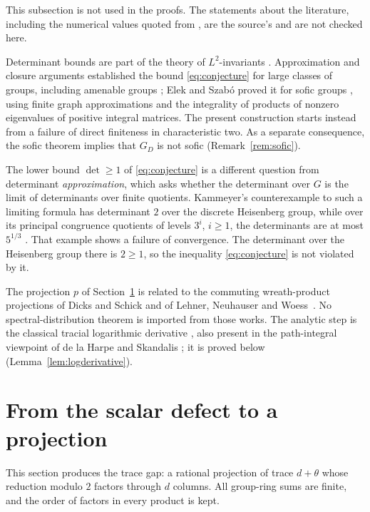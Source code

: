 \documentclass[11pt]{article}
\theoremstyle{remark}
\numberwithin{equation}{section}
\begin{document}
This subsection is not used in the proofs. The statements about the literature, including the numerical values quoted from \cite{Kammeyer2026}, are the source's and are not checked here.

Determinant bounds are part of the theory of $L^2$-invariants \cite{Luck2002}. Approximation and closure arguments established the bound \eqref{eq:conjecture} for large classes of groups, including amenable groups \cite[Theorem 1.21, with its erratum]{Schick2001}; Elek and Szab\'o proved it for sofic groups \cite[Theorem 5]{ElekSzabo2005}, using finite graph approximations and the integrality of products of nonzero eigenvalues of positive integral matrices. The present construction starts instead from a failure of direct finiteness in characteristic two. As a separate consequence, the sofic theorem implies that $G_D$ is not sofic (Remark~\ref{rem:sofic}).

The lower bound $\det\ge1$ of \eqref{eq:conjecture} is a different question from determinant \emph{approximation}, which asks whether the determinant over $G$ is the limit of determinants over finite quotients. Kammeyer's counterexample to such a limiting formula has determinant $2$ over the discrete Heisenberg group, while over its principal congruence quotients of levels $3^i$, $i\ge1$, the determinants are at most $5^{1/3}$ \cite[Theorem 2 and Section 2]{Kammeyer2026}. That example shows a failure of convergence. The determinant over the Heisenberg group there is $2\ge1$, so the inequality \eqref{eq:conjecture} is not violated by it.

The projection $p$ of Section~\ref{sec:projection} is related to the commuting wreath-product projections of Dicks and Schick \cite[Section 3]{DicksSchick2002} and of Lehner, Neuhauser and Woess~\cite[Section 2]{LehnerNeuhauserWoess2008}. No spectral-distribution theorem is imported from those works. The analytic step is the classical tracial logarithmic derivative \cite[Lemma 2]{FK1952}, also present in the path-integral viewpoint of de la Harpe and Skandalis \cite[Lemma 1 and Proposition 2(d)]{deLaHarpeSkandalis1984}; it is proved below (Lemma~\ref{lem:logderivative}).

\section{From the scalar defect to a projection}
\label{sec:projection}

This section produces the trace gap: a rational projection of trace $d+\theta$ whose reduction modulo $2$ factors through $d$ columns. All group-ring sums are finite, and the order of factors in every product is kept.
\end{document}
